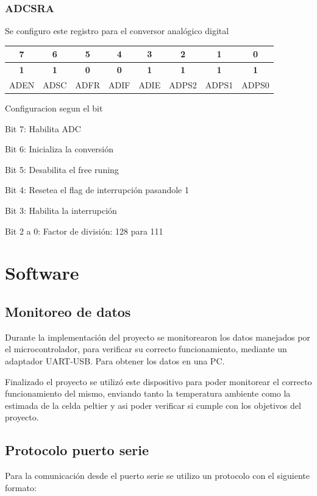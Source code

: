 \documentclass[10pt,spanish,a4paper,openany,notitlepage]{article}
\begin{document}
\subsubsection{ADCSRA}
Se configuro este registro para el conversor analógico digital
\begin{center}
\begin{tabular}{|c|c|c|c|c|c|c|c|}\hline
7&6&5&4&3&2&1&0\\\hline
\textbf{1}&\textbf{1}&\textbf{0}&\textbf{0}&\textbf{1}&\textbf{1}&\textbf{1}&\textbf{1}\\\hline
ADEN&ADSC&ADFR&ADIF&ADIE&ADPS2&ADPS1&ADPS0\\\hline
\end{tabular}
\end{center}

\begin{description}
\item{Configuracion segun el bit}
\item{Bit 7}: Habilita ADC
\item{Bit 6}: Inicializa la conversión
\item{Bit 5}: Desabilita el free runing
\item{Bit 4}: Resetea el flag de interrupción pasandole 1
\item{Bit 3}: Habilita la interrupción
\item{Bit 2 a 0}: Factor de división: 128 para 111
\end{description}

\section{Software}

\subsection{Monitoreo de datos}

Durante la implementación del proyecto se monitorearon los datos manejados
por el microcontrolador, para verificar su correcto funcionamiento, mediante
un adaptador UART-USB. Para obtener los datos en una PC.

Finalizado el proyecto se utilizó este dispositivo para poder monitorear
el correcto funcionamiento del mismo, enviando tanto la temperatura
ambiente como la estimada de la celda peltier y asi poder verificar si cumple con los objetivos del proyecto.

\subsection{Protocolo puerto serie}
Para la comunicación desde el puerto serie se utilizo un protocolo con el siguiente formato:
\end{document}
